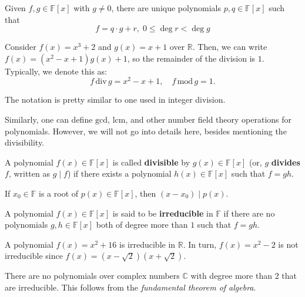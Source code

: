 \documentclass[../lecture-notes.tex]{subfiles}
\begin{document}
\begin{theorem}
    Given $f,g \in \mathbb{F}[x]$ with $g \neq 0$, there are unique polynomials $p,q \in \mathbb{F}[x]$ such that 
    \begin{equation}
        f = q \cdot g + r, \; 0 \leq \deg r < \deg g
    \end{equation}
\end{theorem}

\begin{example}
    Consider $f(x) = x^3+2$ and $g(x) = x+1$ over $\mathbb{R}$. Then, we can write $f(x) = (x^2-x+1)g(x) + 1$, so the remainder of the division is $1$. Typically, we denote this as:
    \begin{equation}
        f \, \text{div} \, g = x^2-x+1, \quad f \, \text{mod} \, g = 1.
    \end{equation}

    The notation is pretty similar to one used in integer division.
\end{example}

Similarly, one can define $\text{gcd}$, $\text{lcm}$, and other number field theory operations for polynomials. However, we will not go into details here, besides mentioning the divisibility.

\begin{definition}
    A polynomial $f(x) \in \mathbb{F}[x]$ is called \textbf{divisible} by $g(x) \in \mathbb{F}[x]$ (or, $g$ \textbf{divides} $f$, written as $g \mid f$) if there exists a polynomial $h(x) \in \mathbb{F}[x]$ such that $f=gh$.
\end{definition}

\begin{theorem}
    If $x_0 \in \mathbb{F}$ is a root of $p(x) \in \mathbb{F}[x]$, then $(x-x_0) \mid p(x)$.
\end{theorem}

\begin{definition}
    A polynomial $f(x) \in \mathbb{F}[x]$ is said to be \textbf{irreducible} in $\mathbb{F}$ if there are no polynomials $g,h \in \mathbb{F}[x]$ both of degree more than $1$ such that $f = gh$.
\end{definition}

\begin{example}
    A polynomial $f(x) = x^2+16$ is irreducible in $\mathbb{R}$. In turn, $f(x) = x^2-2$ is not irreducible since $f(x) = (x-\sqrt{2})(x+\sqrt{2})$. 
\end{example}

\begin{example}
    There are no polynomials over complex numbers $\mathbb{C}$ with degree more than $2$ that are irreducible. This follows from the \textit{fundamental theorem of algebra}.
\end{example}
\end{document}
